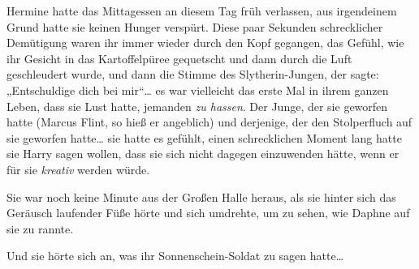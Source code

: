 Hermine hatte das Mittagessen an diesem Tag früh verlassen, aus irgendeinem Grund hatte sie keinen Hunger verspürt. Diese paar Sekunden schrecklicher Demütigung waren ihr immer wieder durch den Kopf gegangen, das Gefühl, wie ihr Gesicht in das Kartoffelpüree gequetscht und dann durch die Luft geschleudert wurde, und dann die Stimme des Slytherin-Jungen, der sagte: „Entschuldige dich bei mir“… es war vielleicht das erste Mal in ihrem ganzen Leben, dass sie Lust hatte, jemanden \emph{zu hassen}. Der Junge, der sie geworfen hatte (Marcus Flint, so hieß er angeblich) und derjenige, der den Stolperfluch auf sie geworfen hatte… sie hatte es gefühlt, einen schrecklichen Moment lang hatte sie Harry sagen wollen, dass sie sich nicht dagegen einzuwenden hätte, wenn er für sie \emph{kreativ} werden würde.

Sie war noch keine Minute aus der Großen Halle heraus, als sie hinter sich das Geräusch laufender Füße hörte und sich umdrehte, um zu sehen, wie Daphne auf sie zu rannte.

Und sie hörte sich an, was ihr Sonnenschein-Soldat zu sagen hatte…

